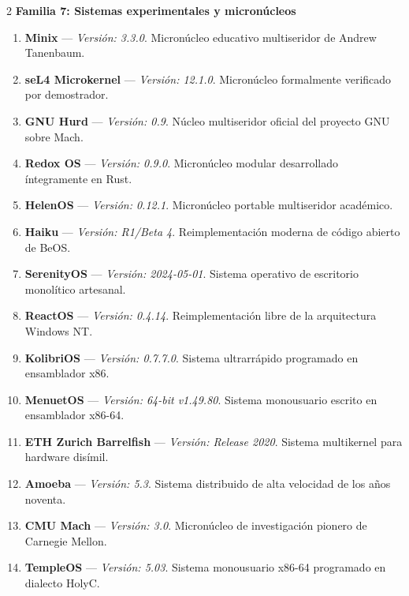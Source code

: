 \documentclass[12pt]{article}
\begin{document}
\begin{multicols}{2}
\medskip
\noindent\textbf{Familia 7: Sistemas experimentales y micronúcleos}\par\smallskip
\begin{enumerate}[label=\textbf{\arabic*.}, leftmargin=*, noitemsep, topsep=1pt, start=95]
    \item \textbf{Minix} --- \textit{Versión: 3.3.0}. Micronúcleo educativo multiseridor de Andrew Tanenbaum.
    \item \textbf{seL4 Microkernel} --- \textit{Versión: 12.1.0}. Micronúcleo formalmente verificado por demostrador.
    \item \textbf{GNU Hurd} --- \textit{Versión: 0.9}. Núcleo multiseridor oficial del proyecto GNU sobre Mach.
    \item \textbf{Redox OS} --- \textit{Versión: 0.9.0}. Micronúcleo modular desarrollado íntegramente en Rust.
    \item \textbf{HelenOS} --- \textit{Versión: 0.12.1}. Micronúcleo portable multiseridor académico.
    \item \textbf{Haiku} --- \textit{Versión: R1/Beta 4}. Reimplementación moderna de código abierto de BeOS.
    \item \textbf{SerenityOS} --- \textit{Versión: 2024-05-01}. Sistema operativo de escritorio monolítico artesanal.
    \item \textbf{ReactOS} --- \textit{Versión: 0.4.14}. Reimplementación libre de la arquitectura Windows NT.
    \item \textbf{KolibriOS} --- \textit{Versión: 0.7.7.0}. Sistema ultrarrápido programado en ensamblador x86.
    \item \textbf{MenuetOS} --- \textit{Versión: 64-bit v1.49.80}. Sistema monousuario escrito en ensamblador x86-64.
    \item \textbf{ETH Zurich Barrelfish} --- \textit{Versión: Release 2020}. Sistema multikernel para hardware disímil.
    \item \textbf{Amoeba} --- \textit{Versión: 5.3}. Sistema distribuido de alta velocidad de los años noventa.
    \item \textbf{CMU Mach} --- \textit{Versión: 3.0}. Micronúcleo de investigación pionero de Carnegie Mellon.
    \item \textbf{TempleOS} --- \textit{Versión: 5.03}. Sistema monousuario x86-64 programado en dialecto HolyC.
\end{enumerate}


\end{multicols}
\end{document}
